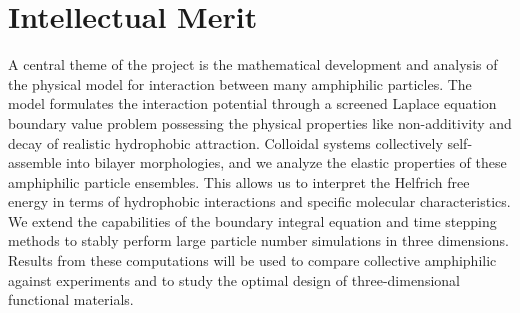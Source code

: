 
%
%

\section{Intellectual Merit}
A central theme of the project is the mathematical development and
analysis of the physical model for interaction between many amphiphilic
particles. The model formulates the interaction potential through a
screened Laplace equation boundary value problem possessing the physical
properties like non-additivity and decay of realistic hydrophobic
attraction. Colloidal systems collectively self-assemble into bilayer
morphologies, and we analyze the elastic properties of these amphiphilic
particle ensembles. This allows us to interpret the Helfrich free energy
in terms of hydrophobic interactions and specific molecular
characteristics. We extend the capabilities of the boundary integral
equation and time stepping methods to stably perform large particle
number simulations in three dimensions. Results from these computations
will be used to compare collective amphiphilic against experiments and
to study the optimal design of three-dimensional functional materials. 

